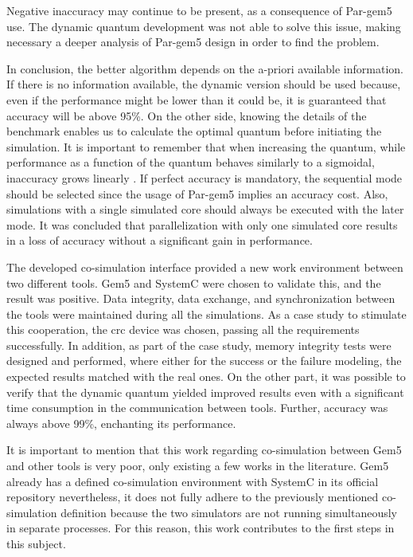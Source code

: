 Negative inaccuracy may continue to be present, as a consequence of Par-gem5 use. The dynamic quantum development was not able to solve this
issue, making necessary a deeper analysis of Par-gem5 design in order to find the problem. 

In conclusion, the better algorithm depends on the a-priori available information. If there is no information available, the dynamic version should be 
used because, even if the performance might be lower than it could be, it is guaranteed that accuracy will be above 95\%. On the other side,
knowing the details of the benchmark enables us to calculate the optimal quantum before initiating the simulation. It is important to 
remember that when increasing the quantum, while performance as a function of the quantum behaves similarly to a sigmoidal, inaccuracy 
grows linearly \cite*{BeyondQuantumTDSim}. If perfect accuracy is mandatory, the sequential mode should be selected since the usage of Par-gem5 
implies an accuracy cost. Also, simulations with a single simulated core should always be 
executed with the later mode. It was concluded that parallelization with only one simulated core results in a loss of accuracy 
without a significant gain in performance.

The developed co-simulation interface provided a new work environment between two different tools. Gem5 and SystemC were chosen to validate 
this, and the result was positive. Data integrity, data exchange, and synchronization between the tools were maintained during all the simulations. 
As a case study to stimulate this cooperation, the \gls{crc} device was chosen, 
passing all the requirements successfully. In addition, as part of the case study, 
memory integrity tests were designed and performed, where either for the success or the failure modeling, the expected results matched
with the real ones. On the other part, it was possible to verify that the dynamic quantum yielded improved results even with a significant 
time consumption in the communication between tools. Further, accuracy was always above 99\%, enchanting its performance. 

It is important to mention that this work regarding co-simulation between Gem5 and other tools is very poor, only existing a few works in the 
literature. Gem5 already has a defined co-simulation environment with SystemC in its official repository nevertheless, it does not 
fully adhere to the previously mentioned co-simulation definition because the two simulators are not running simultaneously in separate processes.
For this reason, this work contributes to the first steps in this subject. 


